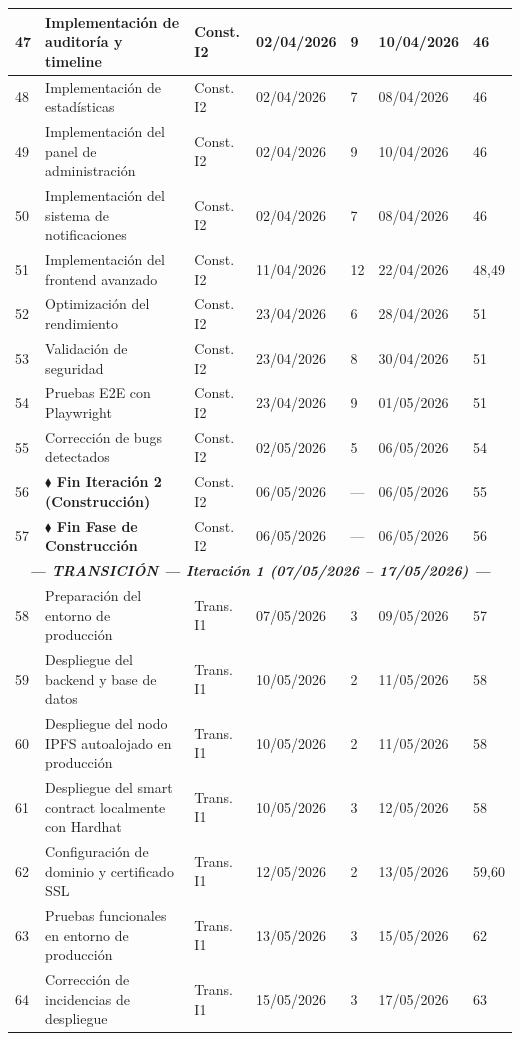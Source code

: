 \documentclass[11pt, a4paper]{article}
\begin{document}
\begin{longtable}{|p{0.6cm}|p{5.2cm}|p{2.5cm}|p{1.9cm}|p{0.9cm}|p{1.9cm}|p{1.4cm}|}
\hline
47 & Implementación de auditoría y timeline & Const. I2 & 02/04/2026 & 9 & 10/04/2026 & 46 \\
\hline
48 & Implementación de estadísticas & Const. I2 & 02/04/2026 & 7 & 08/04/2026 & 46 \\
\hline
49 & Implementación del panel de administración & Const. I2 & 02/04/2026 & 9 & 10/04/2026 & 46 \\
\hline
50 & Implementación del sistema de notificaciones & Const. I2 & 02/04/2026 & 7 & 08/04/2026 & 46 \\
\hline
51 & Implementación del frontend avanzado & Const. I2 & 11/04/2026 & 12 & 22/04/2026 & 48,49 \\
\hline
52 & Optimización del rendimiento & Const. I2 & 23/04/2026 & 6 & 28/04/2026 & 51 \\
\hline
53 & Validación de seguridad & Const. I2 & 23/04/2026 & 8 & 30/04/2026 & 51 \\
\hline
54 & Pruebas E2E con Playwright & Const. I2 & 23/04/2026 & 9 & 01/05/2026 & 51 \\
\hline
55 & Corrección de bugs detectados & Const. I2 & 02/05/2026 & 5 & 06/05/2026 & 54 \\
\hline
56 & \textbf{$\blacklozenge$ Fin Iteración 2 (Construcción)} & Const. I2 & 06/05/2026 & --- & 06/05/2026 & 55 \\
\hline
57 & \textbf{$\blacklozenge$ Fin Fase de Construcción} & Const. I2 & 06/05/2026 & --- & 06/05/2026 & 56 \\
\hline
\multicolumn{7}{|c|}{\textit{\textbf{--- TRANSICIÓN --- Iteración 1 (07/05/2026 -- 17/05/2026) ---}}} \\
\hline
58 & Preparación del entorno de producción & Trans. I1 & 07/05/2026 & 3 & 09/05/2026 & 57 \\
\hline
59 & Despliegue del backend y base de datos & Trans. I1 & 10/05/2026 & 2 & 11/05/2026 & 58 \\
\hline
60 & Despliegue del nodo IPFS autoalojado en producción & Trans. I1 & 10/05/2026 & 2 & 11/05/2026 & 58 \\
\hline
61 & Despliegue del smart contract localmente con Hardhat & Trans. I1 & 10/05/2026 & 3 & 12/05/2026 & 58 \\
\hline
62 & Configuración de dominio y certificado SSL & Trans. I1 & 12/05/2026 & 2 & 13/05/2026 & 59,60 \\
\hline
63 & Pruebas funcionales en entorno de producción & Trans. I1 & 13/05/2026 & 3 & 15/05/2026 & 62 \\
\hline
64 & Corrección de incidencias de despliegue & Trans. I1 & 15/05/2026 & 3 & 17/05/2026 & 63 \\

\end{longtable}
\end{document}
